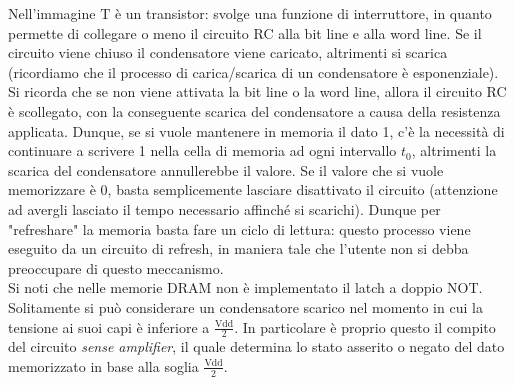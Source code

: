 \documentclass[class=book, crop=false, oneside]{standalone}
\begin{document}
Nell'immagine \(\textrm{T}\) è un transistor: svolge una funzione di interruttore, in quanto permette di collegare o meno il circuito RC alla bit line e alla word line. Se il circuito viene chiuso il condensatore viene caricato, altrimenti si scarica (ricordiamo che il processo di carica/scarica di un condensatore è esponenziale). Si ricorda che se non viene attivata la bit line o la word line, allora il circuito RC è scollegato, con la conseguente scarica del condensatore a causa della resistenza applicata. Dunque, se si vuole mantenere in memoria il dato 1, c'è la necessità di continuare a scrivere 1 nella cella di memoria ad ogni intervallo \(t_0\), altrimenti la scarica del condensatore annullerebbe il valore. Se il valore che si vuole memorizzare è 0, basta semplicemente lasciare disattivato il circuito (attenzione ad avergli lasciato il tempo necessario affinché si scarichi). Dunque per "refreshare" la memoria basta fare un ciclo di lettura: questo processo viene eseguito da un circuito di refresh, in maniera tale che l'utente non si debba preoccupare di questo meccanismo.\\
Si noti che nelle memorie DRAM non è implementato il latch a doppio NOT.\\
Solitamente si può considerare un condensatore scarico nel momento in cui la tensione ai suoi capi è inferiore a \(\frac{\textrm{Vdd}}{2}\). In particolare è proprio questo il compito del circuito \emph{sense amplifier}, il quale determina lo stato asserito o negato del dato memorizzato in base alla soglia \(\frac{\textrm{Vdd}}{2}\).
\end{document}
